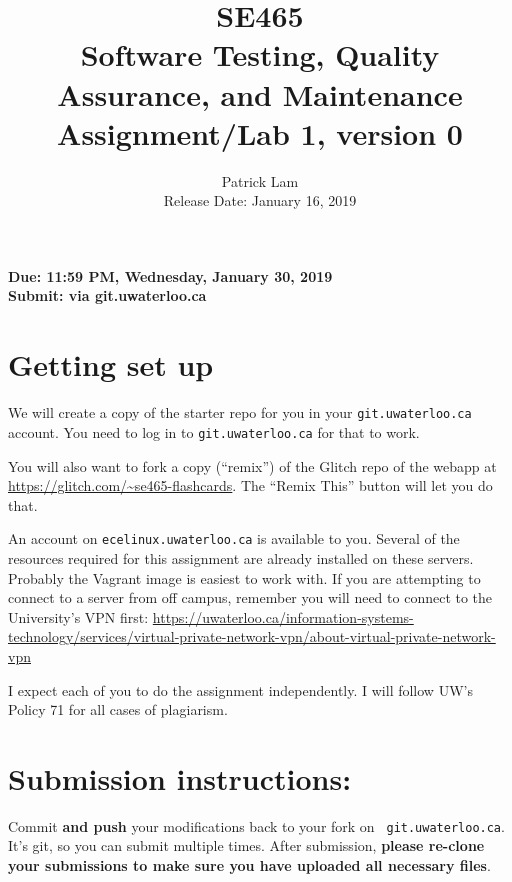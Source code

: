 \documentclass[10pt,hidelinks]{article}
\begin{document}
\title{
SE465 \\
Software Testing, Quality Assurance, and Maintenance\\
Assignment/Lab 1, version 0}
\author{Patrick Lam \\
{Release Date:  January 16, 2019} \\
}
\renewcommand{\today}{}
\maketitle

\begin{center}

{\bf Due:  11:59 PM, Wednesday, January 30, 2019} \\
{\bf Submit: via git.uwaterloo.ca }\\
\end{center}

\section*{Getting set up}
We will create a copy of the starter repo for you in your {\tt git.uwaterloo.ca} account. You need to log in to {\tt git.uwaterloo.ca} for that to work.

You will also want to fork a copy (``remix'') of the Glitch repo of the webapp at
\url{https://glitch.com/~se465-flashcards}. The ``Remix This'' button will let you do that.

An account on {\tt ecelinux.uwaterloo.ca} is available to you.
Several of the resources required for this assignment are already installed on these servers. Probably the Vagrant image is easiest to work with.
If you are attempting to connect to a server from off campus, remember you will need to connect to the University's VPN first: \url{https://uwaterloo.ca/information-systems-technology/services/virtual-private-network-vpn/about-virtual-private-network-vpn}

I expect each of you to do the assignment independently. I will follow UW's Policy 71 for all cases of plagiarism.
 
\newpage
 \section*{Submission instructions:} 
Commit {\bf and push} your modifications back to your fork on {\tt
  git.uwaterloo.ca}.  It's git, so you can submit multiple times. After
submission, {\bf please re-clone your submissions to make sure you
  have uploaded all necessary files}.
 
\end{document}
